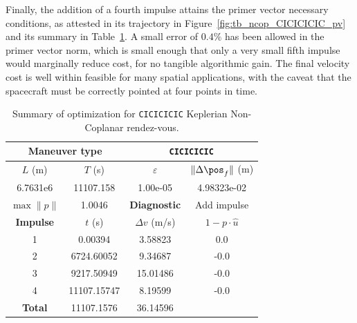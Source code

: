 Finally, the addition of a fourth impulse attains the primer vector necessary conditions, as attested in its trajectory in Figure~\ref{fig:tb_ncop_CICICICIC_pv} and its summary in Table~\ref{tab:tb_nr_CICICICIC_tab}. A small error of \(0.4\%\) has been allowed in the primer vector norm, which is small enough that only a very small fifth impulse would marginally reduce cost, for no tangible algorithmic gain. The final velocity cost is well within feasible for many spatial applications, with the caveat that the spacecraft must be correctly pointed at four points in time. 

\begin{table}[htpb]
    \centering
    \begin{tabular}{cccc} \toprule
    \multicolumn{2}{c}{\textbf{Maneuver type}} & \multicolumn{2}{c}{\texttt{CICICICIC}} \\ \midrule
    \(L\) (m) & \(T\) (s) & \(\varepsilon\) & \(\lVert \Delta \pos_{f} \rVert\) (m)    \\ \midrule
    6.7631e6          & 11107.158          & 1.00e-05                & 4.98323e-02                        \\ \midrule
    \(\max \lVert p \rVert\) & 1.0046     & \textbf{Diagnostic}   & Add impulse        \\ \midrule
    \textbf{Impulse} & \(t\) (s) & \(\Delta v\) (m/s) & \(1 - p \cdot \hat{u}\) \\ \midrule
    1                 & 0.00394          & 3.58823             & 0.0                    \\
    2                 & 6724.60052          & 9.34687             & -0.0                    \\
    3                 & 9217.50949          & 15.01486             & -0.0                    \\
    4                 & 11107.15747          & 8.19599             & -0.0                    \\\midrule
    \textbf{Total}   & 11107.1576          & 36.14596             &                     \\ \bottomrule   
    \end{tabular}
    \caption{Summary of optimization for \texttt{CICICICIC} Keplerian Non-Coplanar rendez-vous.}
    \label{tab:tb_nr_CICICICIC_tab}
\end{table}

